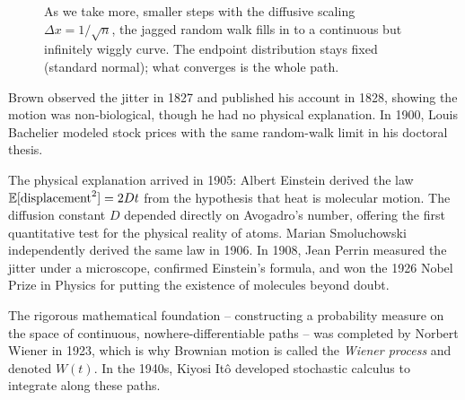 \begin{figure}[H]
\centering
{}
\caption{As we take more, smaller steps with the diffusive scaling
$\Delta x = 1/\sqrt n$, the jagged random walk fills in to a continuous but
infinitely wiggly curve. The endpoint distribution stays fixed (standard normal);
what converges is the whole path.}
\label{ch29:fig-scaling}
\end{figure}

\begin{historybox}
Brown observed the jitter in 1827 and published his account in 1828, showing
the motion was non-biological, though he had no physical explanation. In 1900,
Louis Bachelier modeled stock prices with the same random-walk limit in his doctoral
thesis.

The physical explanation arrived in 1905: Albert Einstein
derived the law $\operatorname{\mathbb{E}}[\text{displacement}^2] = 2Dt$ from the hypothesis that heat is
molecular motion. The diffusion constant $D$ depended directly on Avogadro's number,
offering the first quantitative test for the physical reality of atoms. Marian
Smoluchowski independently derived the same law in 1906. In 1908, Jean Perrin
measured the jitter under a microscope, confirmed Einstein's formula, and won the
1926 Nobel Prize in Physics for putting the existence of molecules beyond doubt.

The rigorous mathematical foundation -- constructing a probability measure on the
space of continuous, nowhere-differentiable paths -- was completed by Norbert Wiener
in 1923, which is why Brownian motion is called the \emph{Wiener process} and denoted
$W(t)$. In the 1940s, Kiyosi It\^o developed stochastic calculus to integrate along
these paths.
\end{historybox}


